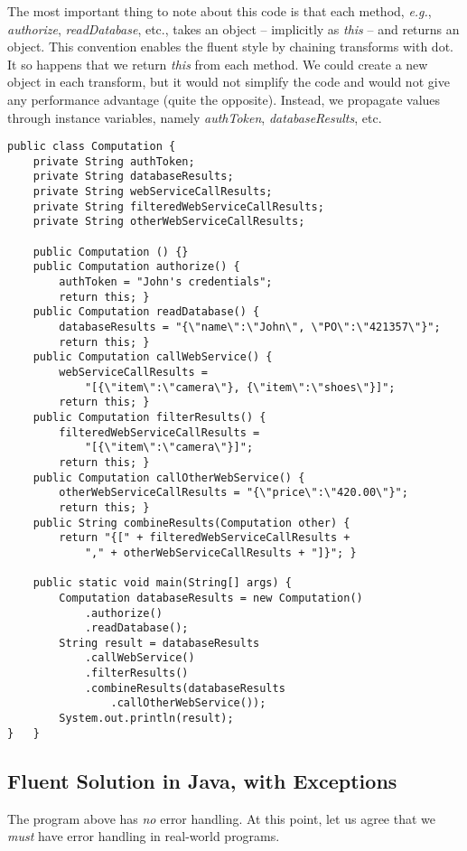\documentclass[11pt]{article}
\begin{document}
The most important thing to note about this code is that each
method, \emph{e.g.}, \emph{authorize}, \emph{readDatabase}, etc., takes an object
-- implicitly as \emph{this} -- and returns an object. This convention
enables the fluent style by chaining transforms with dot. It so
happens that we return \emph{this} from each method. We could create a
new object in each transform, but it would not simplify the code and
would not give any performance advantage (quite the opposite).
Instead, we propagate values through instance variables, namely
\emph{authToken}, \emph{databaseResults}, etc. 

\begin{verbatim}
public class Computation {
    private String authToken;
    private String databaseResults;
    private String webServiceCallResults;
    private String filteredWebServiceCallResults;
    private String otherWebServiceCallResults;

    public Computation () {}
    public Computation authorize() {
        authToken = "John's credentials";
        return this; }
    public Computation readDatabase() {
        databaseResults = "{\"name\":\"John\", \"PO\":\"421357\"}";
        return this; }
    public Computation callWebService() {
        webServiceCallResults =
            "[{\"item\":\"camera\"}, {\"item\":\"shoes\"}]";
        return this; }
    public Computation filterResults() {
        filteredWebServiceCallResults =
            "[{\"item\":\"camera\"}]";
        return this; }
    public Computation callOtherWebService() {
        otherWebServiceCallResults = "{\"price\":\"420.00\"}";
        return this; }
    public String combineResults(Computation other) {
        return "{[" + filteredWebServiceCallResults +
            "," + otherWebServiceCallResults + "]}"; }

    public static void main(String[] args) {
        Computation databaseResults = new Computation()
            .authorize()
            .readDatabase();
        String result = databaseResults
            .callWebService()
            .filterResults()
            .combineResults(databaseResults
                .callOtherWebService());
        System.out.println(result);
}   }
\end{verbatim}
\subsection{Fluent Solution in Java, with Exceptions}
\label{sec-2-2}

The program above has \emph{no} error handling. At this point, let us
agree that we \emph{must} have error handling in real-world programs.
\end{document}
